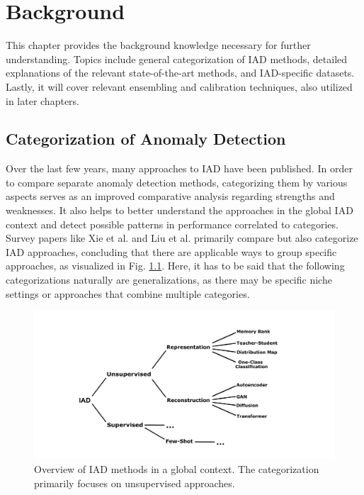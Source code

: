 \chapter{Background}
\label{chap:background}

This chapter provides the background knowledge necessary for further understanding. Topics include general categorization of IAD methods, detailed explanations of the relevant 
state-of-the-art methods, and IAD-specific datasets. Lastly, it will cover relevant ensembling and calibration techniques, also utilized in later chapters.



\section{Categorization of Anomaly Detection}
\label{sec:IADcategs}
Over the last few years, many approaches to IAD have been published. In order to compare separate anomaly detection methods, categorizing them by various 
aspects serves as an improved comparative analysis regarding strengths and weaknesses. It also helps to better understand the approaches in the global IAD context and
detect possible patterns in performance correlated to categories. Survey papers like Xie et al. \cite{Xie_2024benchmarking} and 
Liu et al.
\cite{liu2024deep} primarily compare but also categorize IAD approaches, concluding that there are applicable ways to group specific approaches, as 
visualized in Fig. \ref{fig:IADcategstree}. Here, it has to be said that the following categorizations naturally are generalizations, as there may be specific niche settings or approaches that combine multiple categories.


\begin{figure}[H]
\centering
\includegraphics[width=\textwidth]{figures/Wald.pdf}
\caption{Overview of IAD methods in a global context. The categorization primarily focuses on unsupervised approaches.}
\label{fig:IADcategstree}
\end{figure}

